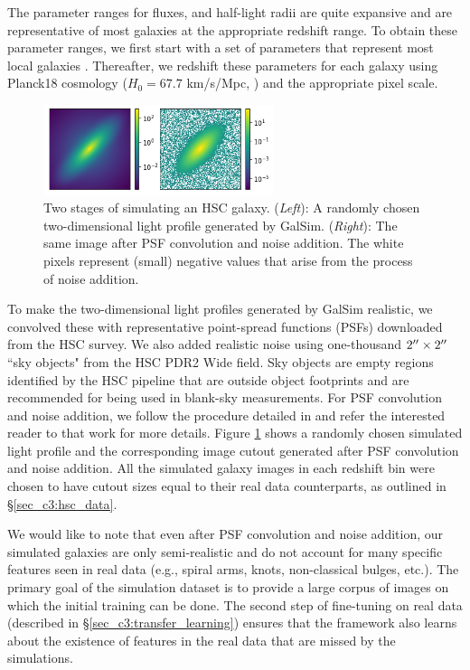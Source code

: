 The parameter ranges for fluxes, and half-light radii are quite expansive and are representative of most galaxies at the appropriate redshift range. To obtain these parameter ranges, we first start with a set of parameters that represent most local galaxies \citep{binney_and_merrifield}. Thereafter, we redshift these parameters for each galaxy using Planck18 cosmology ($H_0=67.7$ km/s/Mpc, \citealp{planck18}) and the appropriate pixel scale.

\begin{figure}[htb]
    \centering
    \includegraphics[width = 0.6\textwidth]{sim_process.png}
    \caption{Two stages of simulating an HSC galaxy. (\textit{Left}): A randomly chosen two-dimensional light profile generated by GalSim. (\textit{Right}): The same image after PSF convolution and noise addition. The white pixels represent (small) negative values that arise from the process of noise addition.}
    \label{fig_c3:sim_process}
\end{figure}

To make the two-dimensional light profiles generated by GalSim realistic, we convolved these with representative point-spread functions (PSFs) downloaded from the HSC survey. We also added realistic noise using one-thousand $2\mbox{$^{\prime\prime}$}\times2\mbox{$^{\prime\prime}$}$ ``sky objects" from the HSC PDR2 Wide field. Sky objects are empty regions identified by the HSC pipeline that are outside object footprints and are recommended for being used in blank-sky measurements. For PSF convolution and noise addition, we follow the procedure detailed in \citet{gampen_software_paper} and refer the interested reader to that work for more details. Figure \ref{fig_c3:sim_process} shows a randomly chosen simulated light profile and the corresponding image cutout generated after PSF convolution and noise addition. All the simulated galaxy images in each redshift bin were chosen to have cutout sizes equal to their real data counterparts, as outlined in \S \ref{sec_c3:hsc_data}. 

We would like to note that even after PSF convolution and noise addition, our simulated galaxies are only semi-realistic and do not account for many specific features seen in real data (e.g., spiral arms, knots, non-classical bulges, etc.). The primary goal of the simulation dataset is to provide a large corpus of images on which the initial training can be done. The second step of fine-tuning \gampen{} on real data (described in \S \ref{sec_c3:transfer_learning}) ensures that the framework also learns about the existence of features in the real data that are missed by the simulations.

